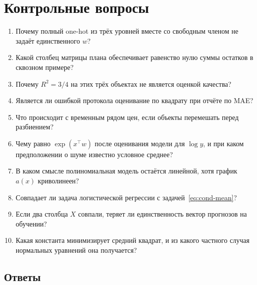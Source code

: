 \documentclass[11pt,a4paper]{article}
\begin{document}
\section{Контрольные вопросы}

\begin{enumerate}
\item Почему полный one-hot из трёх уровней вместе со свободным членом не задаёт единственного \(w\)?
\item Какой столбец матрицы плана обеспечивает равенство нулю суммы остатков в сквозном примере?
\item Почему \(R^{2}=3/4\) на этих трёх объектах не является оценкой качества?
\item Является ли ошибкой протокола оценивание по квадрату при отчёте по MAE?
\item Что происходит с временным рядом цен, если объекты перемешать перед разбиением?
\item Чему равно \(\exp(x^{\top}w)\) после оценивания модели для \(\log y\), и при каком предположении о шуме известно условное среднее?
\item В каком смысле полиномиальная модель остаётся линейной, хотя график \(a(x)\) криволинеен?
\item Совпадает ли задача логистической регрессии с задачей~\eqref{eq:cond-mean}?
\item Если два столбца \(X\) совпали, теряет ли единственность вектор прогнозов на обучении?
\item Какая константа минимизирует средний квадрат, и из какого частного случая нормальных уравнений она получается?
\end{enumerate}

\subsection{Ответы}
\end{document}
